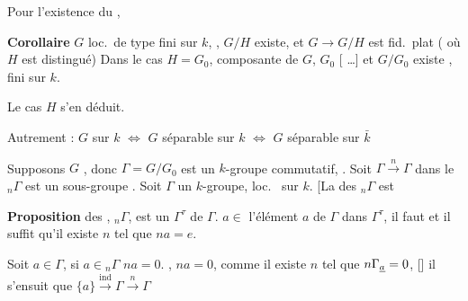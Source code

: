 \documentclass[11pt,a4paper]{article}
\begin{document}
Pour \ill{} l'existence du , \ill{} \ill{} \ill{} \ill{}

\textbf{Corollaire} \quad $G$  loc.\ de type fini sur $k$, \ill{} \ill{}  \ill{},  $G/H$ existe, et $G \to G/H$ est fid.\ plat ( où $H$ est distingué)  Dans le cas $H = G_0$, \ill{} composante \ill{} de $G$, \ill{} $G_0$ [\ill{}  …] et $G/G_0$ existe , \ill{} \ill{} \ill{}  \ill{} fini sur $k$.


Le cas $H$  s'en déduit.

 Autrement  : $G$  sur $k$ $\Longleftrightarrow$ $G$ séparable sur $k$ $\Longleftrightarrow$ $G$ séparable sur $\bar k$ \ill{}

Supposons $G$ ,  donc  $\Gamma = G/G_0$ est un \struck{\ill{}}  $k$-groupe commutatif, \ill{} \ill{} \ill{} \ill{}. Soit $\Gamma \xrightarrow{\ n\ } \Gamma$ \ill{} \ill{} \ill{} \ill{} dans le  ${}_n\Gamma$ est un sous-groupe . Soit $\Gamma$ un $k$-groupe, loc.\  sur $k$. [La  des ${}_n\Gamma$ est  \add{\ill{} \ill{}}


\textbf{Proposition} \quad {}  des \ill{} \ill{}, \ill{} ${}_n\Gamma$, est un \ill{} \ill{} \ill{} \ill{} $\Gamma^\tau$ de $\Gamma$. \ill{} \ill{} $a \in$ l'élément $a$ de $\Gamma$  dans $\Gamma^\tau$, il faut et il suffit qu'il existe $n$ tel que $na = e$.


Soit $a \in \Gamma$, \struck{\ill{}} si $a \in {}_n\Gamma$ \ill{} \ill{} $na = 0$. , \ill{} $na = 0$, comme il existe \ill{} $n$ tel que $n\Gamma_{\uncertain{a}} = 0$, [] il s'ensuit que \struck{\ill{}} $\{a\} \xrightarrow{\text{ind}} \Gamma \xrightarrow{\ n\ } \Gamma$
\end{document}
